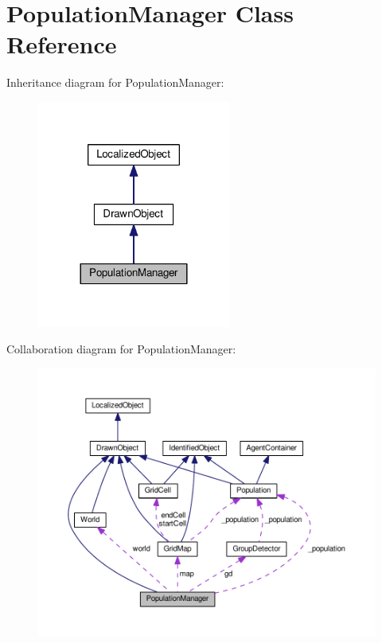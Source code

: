 \hypertarget{classPopulationManager}{}\section{Population\+Manager Class Reference}
\label{classPopulationManager}


Inheritance diagram for Population\+Manager\+:\nopagebreak
\begin{figure}[H]
\begin{center}
\leavevmode
\includegraphics[width=180pt]{classPopulationManager__inherit__graph}
\end{center}
\end{figure}


Collaboration diagram for Population\+Manager\+:\nopagebreak
\begin{figure}[H]
\begin{center}
\leavevmode
\includegraphics[width=350pt]{classPopulationManager__coll__graph}
\end{center}
\end{figure}
